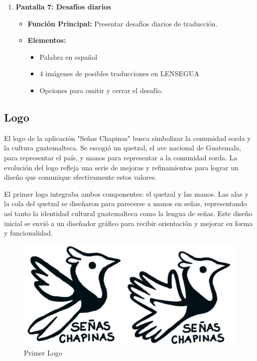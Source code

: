 \begin{enumerate}
    \item \textbf{Pantalla 7: Desafíos diarios}
    \begin{itemize}
        \item \textbf{Función Principal:} Presentar desafíos diarios de traducción.
        \item \textbf{Elementos:}
        \begin{itemize}
            \item Palabra en español
            \item 4 imágenes de posibles traducciones en LENSEGUA
            \item Opciones para omitir y cerrar el desafío.
        \end{itemize}
    \end{itemize}
\end{enumerate}



\subsection{Logo}

El logo de la aplicación "Señas Chapinas" busca simbolizar la comunidad sorda y la cultura guatemalteca. Se escogió un quetzal, el ave nacional de Guatemala, para representar el país, y manos para representar a la comunidad sorda. La evolución del logo refleja una serie de mejoras y refinamientos para lograr un diseño que comunique efectivamente estos valores.

El primer logo integraba ambos componentes: el quetzal y las manos. Las alas y la cola del quetzal se diseñaron para parecerse a manos en señas, representando así tanto la identidad cultural guatemalteca como la lengua de señas. Este diseño inicial se envió a un diseñador gráfico para recibir orientación y mejorar su forma y funcionalidad.

\begin{figure} [H]
    \centering
    \includegraphics[width=0.75\linewidth]{figuras/primerLogo.png}
    \caption{Primer Logo}
    \label{fig:enter-label}
\end{figure}

